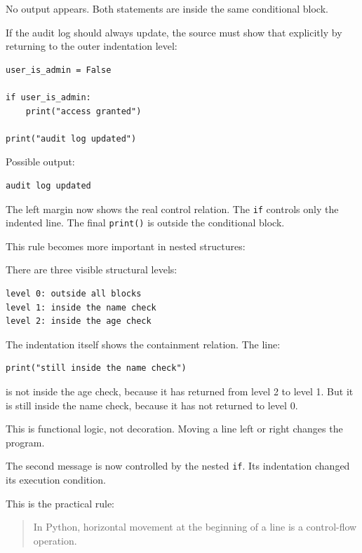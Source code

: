 No output appears. Both statements are inside the same conditional block.

If the audit log should always update, the source must show that explicitly by returning to the outer indentation level:

\begin{verbatim}
user_is_admin = False

if user_is_admin:
    print("access granted")

print("audit log updated")
\end{verbatim}

Possible output:

\begin{verbatim}
audit log updated
\end{verbatim}

The left margin now shows the real control relation. The \texttt{if} controls only the indented line. The final \texttt{print()} is outside the conditional block.

This rule becomes more important in nested structures:

There are three visible structural levels:

\begin{verbatim}
level 0: outside all blocks
level 1: inside the name check
level 2: inside the age check
\end{verbatim}

The indentation itself shows the containment relation. The line:

\begin{verbatim}
print("still inside the name check")
\end{verbatim}

is not inside the age check, because it has returned from level 2 to level 1. But it is still inside the name check, because it has not returned to level 0.

This is functional logic, not decoration. Moving a line left or right changes the program.

The second message is now controlled by the nested \texttt{if}. Its indentation changed its execution condition.

This is the practical rule:

\begin{quote}
In Python, horizontal movement at the beginning of a line is a control-flow operation.
\end{quote}


